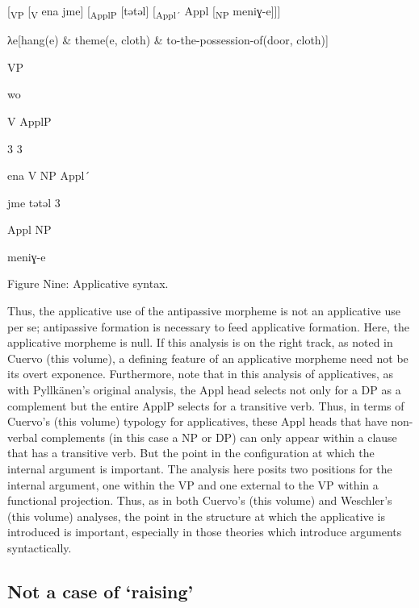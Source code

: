 \documentclass[output=paper,modfonts,nonflat]{langsci/langscibook}
\begin{document}
          [\textsubscript{VP} [\textsubscript{V} ena jme] [\textsubscript{ApplP} [tǝtǝl] [\textsubscript{Appl´} Appl [\textsubscript{NP} meniɣ-e]]]

  λe[hang(e) \& theme(e, cloth) \& to-the-possession-of(door, cloth)]

                                              VP  

                                 wo 

        V              ApplP    

3          3

             ena            V        NP         Appl´      

                     jme        tǝtǝl   3

                               Appl         NP

                      meniɣ-e

\begin{stylecaption}
Figure Nine: Applicative syntax.
\end{stylecaption}

  Thus, the applicative use of the antipassive morpheme is not an applicative use per se; antipassive formation is necessary to feed applicative formation.  Here, the applicative morpheme is null.  If this analysis is on the right track, as noted in Cuervo (this volume),  a defining feature of an applicative morpheme need not be its overt exponence.  Furthermore, note that in this analysis of applicatives, as with Pyllkänen’s original  analysis, the Appl head selects not only for a DP as a complement but the entire ApplP selects for a transitive verb.  Thus, in terms of Cuervo’s (this volume) typology for applicatives, these Appl heads that have non-verbal complements (in this case a NP or DP) can only appear within a clause that has a transitive verb. But the point in the configuration at which the internal argument is important.  The analysis here posits two positions for the internal argument, one within the VP and one external to the VP within a functional projection.  Thus, as in both Cuervo’s (this volume) and Weschler’s (this volume) analyses, the point in the structure at which the applicative is introduced is important, especially in those theories which introduce arguments syntactically.  

\subsection{Not a case of ‘raising’} %
\end{document}
